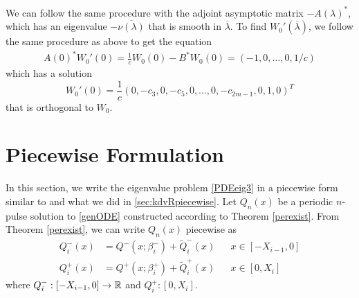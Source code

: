 \documentclass[thesis.tex]{subfiles}
\begin{document}
We can follow the same procedure with the adjoint asymptotic matrix $-A(\lambda)^*$, which has an eigenvalue $-\overline{\nu(\lambda)}$ that is smooth in $\overline{\lambda}$. To find $W_0'(\overline{\lambda})$, we follow the same procedure as above to get the equation
\begin{align*}
A(0)^* W_0'(0) = \frac{1}{c} W_0(0) - B^* W_0(0)
= (-1, 0, \dots, 0, 1/c)
\end{align*}
which has a solution 
\[
W_0'(0) = \frac{1}{c} \left( 0, -c_3, 0, -c_5, 0, \dots, 0, -c_{2m-1}, 0, 1, 0\right)^T
\]
that is orthogonal to $W_0$.

\section{Piecewise Formulation}

In this section, we write the eigenvalue problem \cref{PDEeig3} in a piecewise form similar to \cite{Sandstede1998} and what we did in \cref{sec:kdvRpiecewise}. Let $Q_n(x)$ be a periodic $n$-pulse solution to \eqref{genODE} constructed according to Theorem \ref{perexist}. From Theorem \ref{perexist}, we can write $Q_n(x)$ piecewise as
\begin{equation}\label{Qnppiece}
\begin{aligned}
Q_i^-(x) &= Q^-(x; \beta_i^-) + \tilde{Q}_i^-(x) && x \in [-X_{i-1}, 0] \\
Q_i^+(x) &= Q^+(x; \beta_i^+) + \tilde{Q}_i^+(x) && x \in [0, X_i]
\end{aligned}
\end{equation}
where $Q_i^-: [-X_{i-1}, 0] \rightarrow \mathbb{R}$ and $Q_i^+: [0, X_i]$. 
\end{document}
